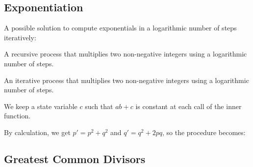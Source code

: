 \subsection{Exponentiation}

\begin{exe}[1.16]
    A possible solution to compute exponentials in a logarithmic number of steps 
    iteratively:
\end{exe}

\begin{exe}[1.17]
    A recursive process that multiplies two non-negative integers using 
    a logarithmic number of steps.
\end{exe}

\begin{exe}[1.18]
    An iterative process that multiplies two non-negative integers using 
    a logarithmic number of steps.

    We keep a state variable $c$ such that $ab + c$ is constant at each call 
    of the inner function.
\end{exe}

\begin{exe}[1.19]
    By calculation, we get $p' = p^2 + q^2$ and $q' = q^2 + 2pq$, so the 
    procedure becomes:
\end{exe}

\subsection{Greatest Common Divisors}


